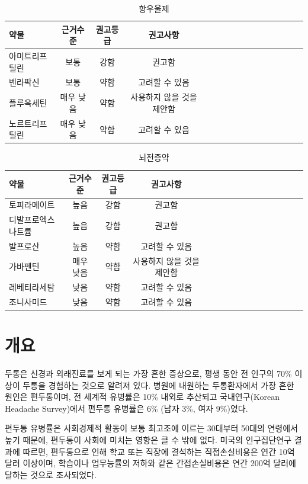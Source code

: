 \documentclass[]{book}
\begin{document}
\begin{longtable}{lccclccclccclccc}
\caption{\label{tab:unnamed-chunk-5}항우울제}\\
\toprule
약물 & 근거수준 & 권고등급 & 권고사항\\
\midrule
아미트리프틸린 & 보통 & 강함 & 권고함\\
벤라팍신 & 보통 & 약함 & 고려할 수 있음\\
플루옥세틴 & 매우 낮음 & 약함 & 사용하지 않을 것을 제안함\\
노르트리프틸린 & 매우 낮음 & 약함 & 고려할 수 있음\\
\bottomrule
\end{longtable}

\begin{longtable}{lccclccclccclccc}
\caption{\label{tab:unnamed-chunk-6}뇌전증약}\\
\toprule
약물 & 근거수준 & 권고등급 & 권고사항\\
\midrule
토피라메이트 & 높음 & 강함 & 권고함\\
디발프로엑스나트륨 & 높음 & 강함 & 권고함\\
발프로산 & 높음 & 약함 & 고려할 수 있음\\
가바펜틴 & 매우 낮음 & 약함 & 사용하지 않을 것을 제안함\\
레베티라세탐 & 낮음 & 약함 & 고려할 수 있음\\
\addlinespace
조니사미드 & 낮음 & 약함 & 고려할 수 있음\\
\bottomrule
\end{longtable}

\hypertarget{section-6}{%
\chapter{개요}\label{section-6}}

두통은 신경과 외래진료를 보게 되는 가장 흔한 증상으로, 평생 동안 전 인구의 70\% 이상이 두통을 경험하는 것으로 알려져 있다. 병원에 내원하는 두통환자에서 가장 흔한 원인은 편두통이며, 전 세계적 유병률은 10\% 내외로 추산되고 국내연구(Korean Headache Survey)에서 편두통 유병률은 6\% (남자 3\%, 여자 9\%)였다.

편두통 유병률은 사회경제적 활동이 보통 최고조에 이르는 30대부터 50대의 연령에서 높기 때문에, 편두통이 사회에 미치는 영향은 클 수 밖에 없다. 미국의 인구집단연구 결과에 따르면, 편두통으로 인해 학교 또는 직장에 결석하는 직접손실비용은 연간 10억 달러 이상이며, 학습이나 업무능률의 저하와 같은 간접손실비용은 연간 200억 달러에 달하는 것으로 조사되었다.
\end{document}
